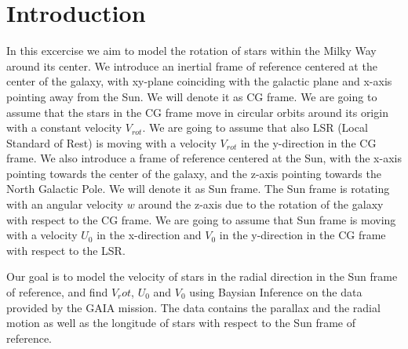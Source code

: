 \section{Introduction}

In this excercise we aim to model the rotation of stars within the Milky Way around its center. 
We introduce an inertial frame of reference centered at the center of the galaxy, 
with xy-plane coinciding with the galactic plane and x-axis pointing away from the Sun. We will denote it as CG frame.
We are going to assume that the stars in the CG frame move in circular orbits around its origin with a constant velocity $V_{rot}$.
We are going to assume that also LSR (Local Standard of Rest) is moving with a velocity $V_{rot}$ in the y-direction in the CG frame.
We also introduce a frame of reference centered at the Sun, with the x-axis pointing towards the center of the galaxy, 
and the z-axis pointing towards the North Galactic Pole. We will denote it as Sun frame.
The Sun frame is rotating with an angular velocity $w$ around the z-axis due to the rotation of the galaxy with respect to the CG frame.
We are going to assume that Sun frame is moving with a velocity $U_0$ in the x-direction and $V_0$ in the y-direction in the CG frame with respect to the LSR.

Our goal is to model the velocity of stars in the radial direction in the Sun frame of reference, 
and find $V_rot$, $U_0$ and $V_0$ using Baysian Inference on the data provided by the GAIA mission. 
The data contains the parallax and the radial motion as well as the longitude of stars with respect to the Sun frame of reference.